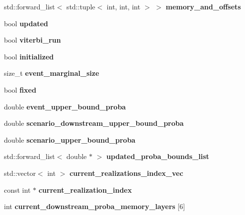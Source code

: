 \begin{DoxyCompactItemize}
std\+::forward\+\_\+list$<$ std\+::tuple$<$ int, int, int $>$ $>$ {\bfseries memory\+\_\+and\+\_\+offsets}
\item 
\mbox{\label{classRec__Event_a4fbeb3694cf3a3ef3097ec2af5e96f3c}} 
bool {\bfseries updated}
\item 
\mbox{\label{classRec__Event_a877417ca96bc33491b73ef9f60c8f9eb}} 
bool {\bfseries viterbi\+\_\+run}
\item 
\mbox{\label{classRec__Event_a835244ce395c153efca8e5b9dff73f06}} 
bool {\bfseries initialized}
\item 
\mbox{\label{classRec__Event_ae18d91f49ea6652853f9c620a3cf2005}} 
size\+\_\+t {\bfseries event\+\_\+marginal\+\_\+size}
\item 
\mbox{\label{classRec__Event_a337f07555611e2d37b962e5e8d4915a6}} 
bool {\bfseries fixed}
\item 
\mbox{\label{classRec__Event_a6ce94f7d653f284678bb31462257579e}} 
double {\bfseries event\+\_\+upper\+\_\+bound\+\_\+proba}
\item 
\mbox{\label{classRec__Event_a6631657503c1b5cd5e6b55cef3bb2c55}} 
double {\bfseries scenario\+\_\+downstream\+\_\+upper\+\_\+bound\+\_\+proba}
\item 
\mbox{\label{classRec__Event_a3ed5d1bcf4a2ca83aebb2e81c0d9a06b}} 
double {\bfseries scenario\+\_\+upper\+\_\+bound\+\_\+proba}
\item 
\mbox{\label{classRec__Event_a23ef7bc59131d34ace470c9bea042e66}} 
std\+::forward\+\_\+list$<$ double $\ast$ $>$ {\bfseries updated\+\_\+proba\+\_\+bounds\+\_\+list}
\item 
\mbox{\label{classRec__Event_a38998c66aa7e4b29284f4c8f35cabbc6}} 
std\+::vector$<$ int $>$ {\bfseries current\+\_\+realizations\+\_\+index\+\_\+vec}
\item 
\mbox{\label{classRec__Event_a57f8109e6fdbee1590cd1a6ddf62242a}} 
const int $\ast$ {\bfseries current\+\_\+realization\+\_\+index}
\item 
\mbox{\label{classRec__Event_afaac2c8eb6698209ab356b892e379000}} 
int {\bfseries current\+\_\+downstream\+\_\+proba\+\_\+memory\+\_\+layers} \mbox{[}6\mbox{]}
\end{DoxyCompactItemize}


